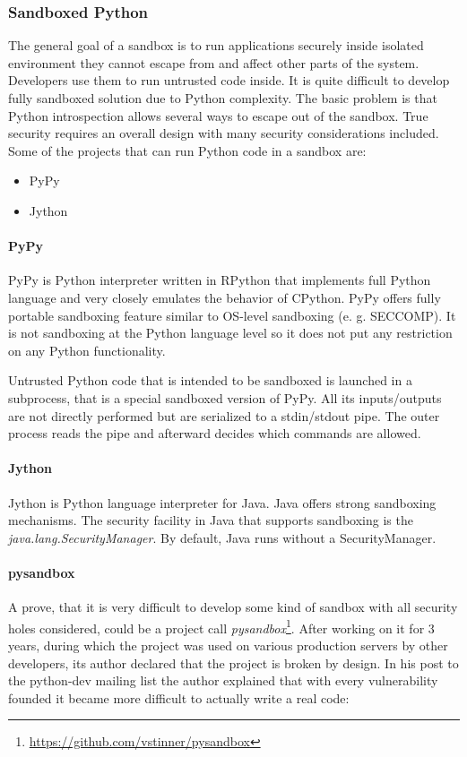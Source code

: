 \documentclass[12pt,a4paper]{article}
\begin{document}
\subsubsection{Sandboxed Python}
The general goal of a sandbox is to run applications securely inside isolated environment they cannot escape from and
affect other parts of the system. Developers use them to run untrusted code inside. It is quite difficult to develop
fully sandboxed solution due to Python complexity. The basic problem is that Python introspection allows several ways
to escape out of the sandbox. True security requires an overall design with many security considerations included. Some
of the projects that can run Python code in a sandbox are:
\begin{itemize}
\item PyPy
\item Jython
\end{itemize}

\paragraph{PyPy} PyPy is Python interpreter written in RPython that implements full Python language and very closely 
emulates the behavior of CPython. PyPy offers fully portable sandboxing feature similar to OS-level sandboxing (e. g. SECCOMP).
It is not sandboxing at the Python language level so it does not put any restriction on any Python functionality.

Untrusted Python code that is intended to be sandboxed is launched in a subprocess, that is a special sandboxed version of PyPy.
All its inputs/outputs are not directly performed but are serialized to a stdin/stdout pipe. The outer process reads the pipe 
and afterward decides which commands are allowed.

\paragraph{Jython} Jython is Python language interpreter for Java. Java offers strong sandboxing mechanisms. The security 
facility in Java that supports sandboxing is the \textit{java.lang.SecurityManager}. By default, Java runs without a 
SecurityManager.

\paragraph{pysandbox} A prove, that it is very difficult to develop some kind of sandbox with all security holes considered, could be a project call \textit{pysandbox}\footnote{\url{https://github.com/vstinner/pysandbox}}. After working on it for 3 years, during which
the project was used on various production servers by other developers, its author declared that the project is broken by
design. In his post to the python-dev mailing list \cite{PyDev_ML} the author explained that with every vulnerability founded
it became more difficult to actually write a real code:
\end{document}
